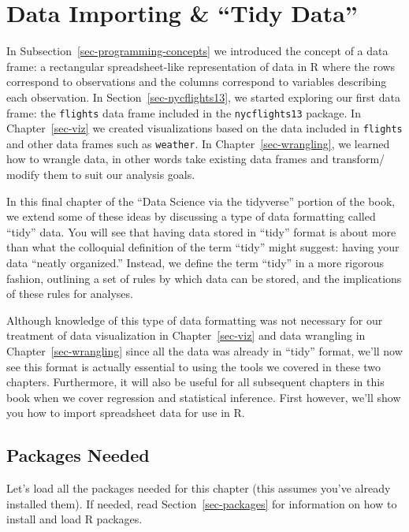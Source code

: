 \documentclass[
  letterpaper,
  DIV=11,
  numbers=noendperiod]{scrreprt}
\theoremstyle{definition}
\theoremstyle{remark}
\begin{document}
\hypertarget{sec-tidy}{%
\chapter{Data Importing \& ``Tidy Data''}\label{sec-tidy}}

In Subsection~\ref{sec-programming-concepts} we introduced the concept
of a data frame: a rectangular spreadsheet-like representation of data
in R where the rows correspond to observations and the columns
correspond to variables describing each observation. In
Section~\ref{sec-nycflights13}, we started exploring our first data
frame: the \texttt{flights} data frame included in the
\texttt{nycflights13} package. In Chapter~\ref{sec-viz} we created
visualizations based on the data included in \texttt{flights} and other
data frames such as \texttt{weather}. In Chapter~\ref{sec-wrangling}, we
learned how to wrangle data, in other words take existing data frames
and transform/ modify them to suit our analysis goals.

In this final chapter of the ``Data Science via the tidyverse'' portion
of the book, we extend some of these ideas by discussing a type of data
formatting called ``tidy'' data. You will see that having data stored in
``tidy'' format is about more than what the colloquial definition of the
term ``tidy'' might suggest: having your data ``neatly organized.''
Instead, we define the term ``tidy'' in a more rigorous fashion,
outlining a set of rules by which data can be stored, and the
implications of these rules for analyses.

Although knowledge of this type of data formatting was not necessary for
our treatment of data visualization in Chapter~\ref{sec-viz} and data
wrangling in Chapter~\ref{sec-wrangling} since all the data was already
in ``tidy'' format, we'll now see this format is actually essential to
using the tools we covered in these two chapters. Furthermore, it will
also be useful for all subsequent chapters in this book when we cover
regression and statistical inference. First however, we'll show you how
to import spreadsheet data for use in R.

\hypertarget{packages-needed-2}{%
\section*{Packages Needed}\label{packages-needed-2}}

Let's load all the packages needed for this chapter (this assumes you've
already installed them). If needed, read Section~\ref{sec-packages} for
information on how to install and load R packages.
\end{document}
